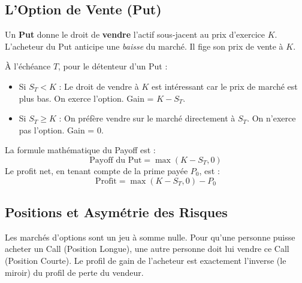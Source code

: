 \subsection{L'Option de Vente (Put)}

\begin{definitionbox}[Le Put]
Un \textbf{Put} donne le droit de \textbf{vendre} l'actif sous-jacent au prix d'exercice $K$.
L'acheteur du Put anticipe une \textit{baisse} du marché. Il fige son prix de vente à $K$.
\end{definitionbox}

\begin{theorembox}
À l'échéance $T$, pour le détenteur d'un Put :
\begin{itemize}[label=$\rightarrow$]
    \item Si $S_T < K$ : Le droit de vendre à $K$ est intéressant car le prix de marché est plus bas. On exerce l'option. Gain = $K - S_T$.
    \item Si $S_T \geq K$ : On préfère vendre sur le marché directement à $S_T$. On n'exerce pas l'option. Gain = $0$.
\end{itemize}
La formule mathématique du Payoff est :
\begin{equation*}
    \text{Payoff du Put} = \max(K - S_T, 0)
\end{equation*}
Le profit net, en tenant compte de la prime payée $P_0$, est :
\begin{equation*}
    \text{Profit} = \max(K - S_T, 0) - P_0
\end{equation*}
\end{theorembox}

\subsection{Positions et Asymétrie des Risques}

\begin{intuitionbox}
Les marchés d'options sont un jeu à somme nulle. Pour qu'une personne puisse acheter un Call (Position Longue), une autre personne doit lui vendre ce Call (Position Courte). Le profil de gain de l'acheteur est exactement l'inverse (le miroir) du profil de perte du vendeur.
\end{intuitionbox}

